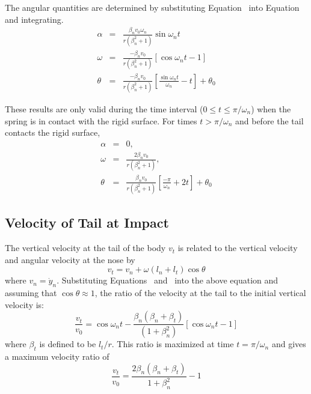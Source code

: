 The angular quantities are determined by substituting
Equation~ into Equation~ and integrating.
\begin{eqnarray}
\alpha & = & \frac{\beta_n v_0\omega_n}{r(\beta_n^2+1)}\sin\omega_n t\\
\omega & = & \frac{-\beta_n v_0}{r(\beta_n^2+1)}[\cos\omega_n t - 1]
               \label{eq:omega}\\
\theta & = & \frac{-\beta_n v_0}{r(\beta_n^2+1)}
                \left[\frac{\sin\omega_n t}{\omega_n} - t\right] + \theta_0
\label{etheta}
\end{eqnarray}

These results are only valid during the time interval ($0\leq t\leq
\pi / \omega_n$) when the spring is in contact with the rigid surface.
For times $t>\pi/\omega_n$ and before the tail contacts the rigid
surface,
\begin{eqnarray}
\alpha & = & 0, \\
\omega & = & \frac{2\beta_n v_0}{r(\beta_n^2+1)},\\
\theta & = & \frac{\beta_n v_0}{r(\beta_n^2+1)}\left[\frac{-\pi}{\omega_n}
      + 2t\right] + \theta_0\label{e12}
\end{eqnarray}

\subsection{Velocity of Tail at Impact}

The vertical velocity at the tail of the body $v_t$ is related to
the vertical velocity and angular velocity at the nose by
\begin{equation}
v_t = v_n + \omega(l_n + l_t)\cos\theta
\end{equation}
where $v_n = \dot y_n$.
Substituting Equations~ and~ into the above
equation and assuming that $\cos\theta\approx 1$, the ratio of the velocity
at the tail to the initial vertical velocity is:
\begin{equation}
\frac{v_t}{v_0} = \cos\omega_nt - \frac{\beta_n(\beta_n+\beta_t)}
{(1+\beta_n^2)}\left[\cos\omega_n t-1\right]\label{eq:vrv0t}
\end{equation}
where $\beta_t$ is defined to be $l_t/r$. This ratio is maximized at
time $t = \pi/\omega_n$ and gives a maximum velocity ratio of
\begin{equation}
\frac{v_t}{v_0} = \frac{2\beta_n(\beta_n+\beta_t)}{1+\beta_n^2} - 1
\label{eq:vrv0}
\end{equation}

